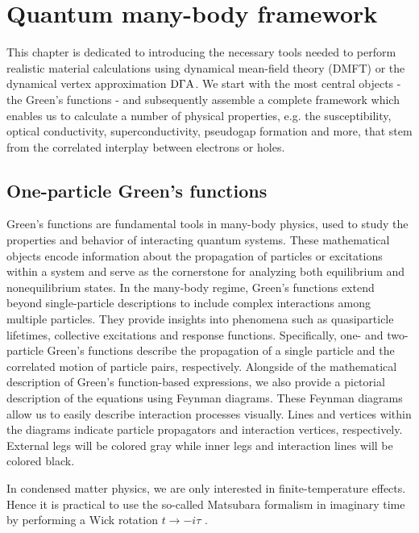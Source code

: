 \documentclass[../../main.tex]{subfiles}
\begin{document}
\sloppy

\chapter{Quantum many-body framework}

This chapter is dedicated to introducing the necessary tools needed to perform realistic material calculations using dynamical mean-field theory (DMFT) or the dynamical vertex approximation $\text{D}\Gamma\text{A}$. We start with the most central objects - the Green's functions - and subsequently assemble a complete framework which enables us to calculate a number of physical properties, e.g. the susceptibility, optical conductivity, superconductivity, pseudogap formation and more, that stem from the correlated interplay between electrons or holes. 

\section{One-particle Green's functions}

Green's functions are fundamental tools in many-body physics, used to study the properties and behavior of interacting quantum systems. These mathematical objects encode information about the propagation of particles or excitations within a system and serve as the cornerstone for analyzing both equilibrium and nonequilibrium states. In the many-body regime, Green's functions extend beyond single-particle descriptions to include complex interactions among multiple particles. They provide insights into phenomena such as quasiparticle lifetimes, collective excitations and response functions. Specifically, one- and two-particle Green's functions describe the propagation of a single particle and the correlated motion of particle pairs, respectively. Alongside of the mathematical description of Green's function-based expressions, we also provide a pictorial description of the equations using Feynman diagrams. These Feynman diagrams allow us to easily describe interaction processes visually. Lines and vertices within the diagrams indicate particle propagators and interaction vertices, respectively. External legs will be colored gray while inner legs and interaction lines will be colored black.

In condensed matter physics, we are only interested in finite-temperature effects. Hence it is practical to use the so-called Matsubara formalism \cite{Matsubara1955} in imaginary time by performing a Wick rotation $t\to -i\tau$ \cite{Wick1954}.
\end{document}
